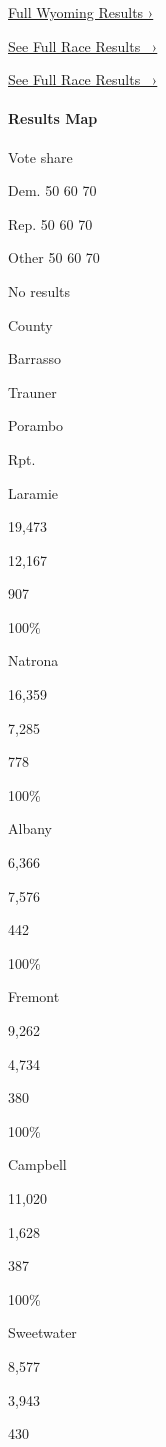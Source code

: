 \href{https://www.nytimes3xbfgragh.onion/interactive/2018/11/06/us/elections/results-wyoming-elections.html}{Full
Wyoming Results ›}

\href{https://www.nytimes3xbfgragh.onion/elections/results/wyoming-senate}{See
Full Race Results~ ›}

\href{https://www.nytimes3xbfgragh.onion/elections/results/wyoming-senate}{See
Full Race Results~ ›}

\hypertarget{results-map}{%
\paragraph{Results Map}\label{results-map}}

Vote share

Dem. 50 60 70

Rep. 50 60 70

Other 50 60 70

No results

County

Barrasso

Trauner

Porambo

Rpt.

Laramie

19,473

12,167

907

100\%

Natrona

16,359

7,285

778

100\%

Albany

6,366

7,576

442

100\%

Fremont

9,262

4,734

380

100\%

Campbell

11,020

1,628

387

100\%

Sweetwater

8,577

3,943

430

